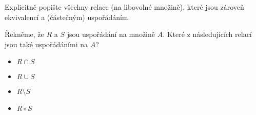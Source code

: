 \begin{exercise}
 Explicitně popište všechny relace (na libovolné množině), které jsou zároveň
 ekvivalencí a (částečným) uspořádáním.
\end{exercise}

\begin{exercise}
 Řekněme, že $R$ a $S$ jsou uspořádání na množině $A$. Které z následujících
 relací jsou také uspořádáními na $A$?
  \begin{itemize}[itemsep=0pt]
  \item $R \cap S$ 
  \item $R \cup S$ 
  \item $R \setminus S$
  \item $R \circ S$
 \end{itemize}
\end{exercise}


